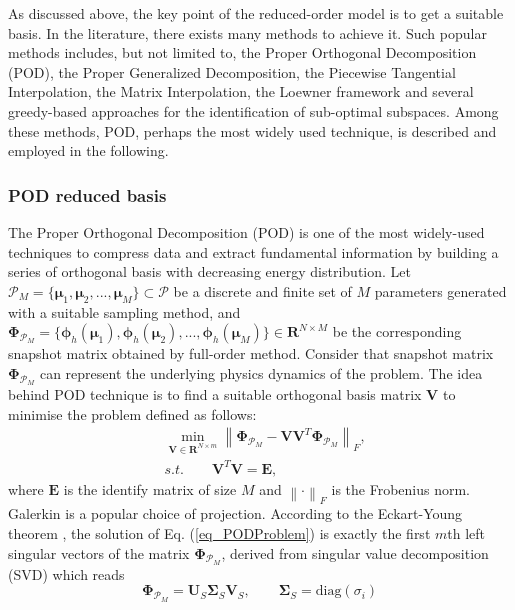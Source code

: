 \documentclass[preprint, 10pt]{elsarticle}
\begin{document}
As discussed above, the key point of the reduced-order model is to get a suitable basis. In the literature, there exists many methods to achieve it. Such popular methods includes, but not limited to, the Proper Orthogonal Decomposition (POD), the Proper Generalized Decomposition, the Piecewise Tangential Interpolation, the Matrix Interpolation, the Loewner framework and several greedy-based approaches for the identification of sub-optimal subspaces. Among these methods, POD, perhaps the most widely used technique, is described and employed in the following.


\subsubsection{POD reduced basis}
The Proper Orthogonal Decomposition (POD) is one of the most widely-used techniques to compress data and extract fundamental information by building a series of orthogonal basis
with decreasing energy distribution.
Let $\mathcal{P}_M=\{\pmb{\mu}_1, \pmb{\mu}_2,...,\pmb{\mu}_M\} \subset \mathcal{P}$ be a discrete and finite set of $M$ parameters generated with a suitable sampling method, and $\pmb {\Phi}_{\mathcal{P}_M}=\{\pmb{\phi}_h(\pmb{\mu}_1), \pmb{\phi}_h(\pmb{\mu}_2),...,\pmb{\phi}_h(\pmb{\mu}_M)\}  \in \mathbf{R}^{N \times M}$ be the corresponding snapshot matrix obtained by full-order method. Consider that snapshot matrix $\pmb {\Phi}_{\mathcal{P}_M}$ can represent the underlying physics dynamics of the problem. The idea behind POD technique is to find a suitable orthogonal basis matrix $\mathbf{V}$ to minimise the problem defined as follows:
\begin{equation}
\begin{aligned}
&\mathop {\min}\limits_{\mathbf{V} \in \mathbf{R}^{N\times m}}
\left\| {\pmb {\Phi}_{\mathcal{P}_M} - \mathbf{V}\mathbf{V}^T \pmb {\Phi}_{\mathcal{P}_M}} \right\|_F, \\
&s.t. \qquad \mathbf{V}^T\mathbf{V} = \mathbf{E},
\end{aligned}
\label{eq_PODProblem}
\end{equation}
where $\mathbf{E}$ is the identify matrix of size $M$ and $\left\| \cdot \right\|_F$ is the Frobenius norm.
Galerkin is a popular choice of projection.
According to the Eckart-Young theorem \cite{eckart1936approximation}, the solution of Eq. (\ref{eq_PODProblem}) is exactly  the first $m$th left singular vectors of the matrix $\pmb {\Phi}_{\mathcal{P}_M}$, derived from singular value decomposition (SVD) which reads
\begin{equation}
\pmb {\Phi}_{\mathcal{P}_M} = \mathbf{U}_S \pmb{\Sigma} _S \mathbf{V}_S, \qquad \pmb{\Sigma} _S = \text{diag} \left(  \sigma _i  \right)
\end{equation}
\end{document}

